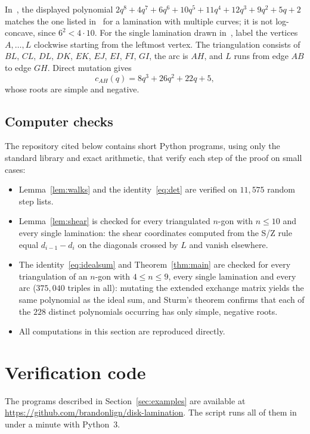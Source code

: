 \documentclass[11pt]{amsart}
\theoremstyle{remark}
\numberwithin{equation}{section}
\begin{document}
In~\cite[Example~6]{KLL}, the displayed polynomial
$2q^8+4q^7+6q^6+10q^5+11q^4+12q^3+9q^2+5q+2$ matches the one listed
in~\cite[Table~4]{KLL} for a lamination with multiple curves; it is not
log-concave, since $6^2<4\cdot10$. For the single lamination drawn
in~\cite[Figure~17]{KLL}, label the vertices $A,\dots,L$ clockwise starting
from the leftmost vertex. The triangulation consists of $BL$, $CL$, $DL$, $DK$,
$EK$, $EJ$, $EI$, $FI$, $GI$, the arc is $AH$, and $L$ runs from edge $AB$ to
edge $GH$. Direct mutation gives
\[
c_{AH}(q)=8q^3+26q^2+22q+5,
\]
whose roots are simple and negative.

\subsection{Computer checks}
The repository cited below contains short Python programs, using only the
standard library and exact arithmetic, that verify each step of the proof on
small cases:
\begin{itemize}
\item Lemma~\ref{lem:walks} and the identity~\eqref{eq:det} are verified on
$11{,}575$ random step lists.
\item Lemma~\ref{lem:shear} is checked for every triangulated $n$-gon with
$n\le10$ and every single lamination: the shear coordinates computed from the
S/Z rule equal $d_{i-1}-d_i$ on the diagonals crossed by $L$ and vanish
elsewhere.
\item The identity~\eqref{eq:idealsum} and Theorem~\ref{thm:main} are checked
for every triangulation of an $n$-gon with $4\le n\le9$, every single
lamination and every arc ($375{,}040$ triples in all): mutating the extended
exchange matrix yields the same polynomial as the ideal sum, and Sturm's
theorem confirms that each of the $228$ distinct polynomials occurring has only
simple, negative roots.
\item All computations in this section are reproduced directly.
\end{itemize}

\section*{Verification code}

The programs described in Section~\ref{sec:examples} are available at\\
\url{https://github.com/brandonlign/disk-lamination}. The script
 runs all of them in under a minute with Python~3.
\end{document}
